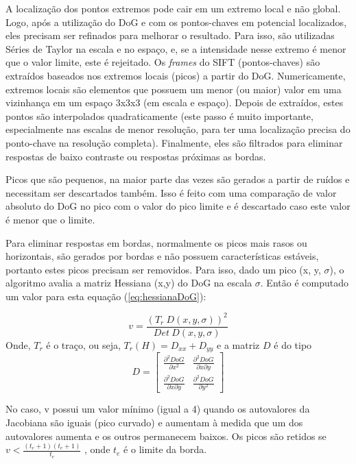 A localização dos pontos extremos pode cair em um extremo local e não global. Logo, após a utilização do DoG e com os pontos-chaves em potencial localizados, eles precisam ser refinados para melhorar o resultado. Para isso, são utilizadas Séries de Taylor na escala e no espaço, e, se a intensidade nesse extremo é menor que o valor limite, este é rejeitado.
Os {\it frames} do SIFT (pontos-chaves) são extraídos baseados nos extremos locais (picos) a partir do DoG. Numericamente, extremos locais são elementos que possuem um menor (ou maior) valor em uma vizinhança em um espaço 3x3x3 (em escala e espaço).
Depois de extraídos, estes pontos são interpolados quadraticamente (este passo é muito importante, especialmente nas escalas de menor resolução, para ter uma localização precisa do ponto-chave na resolução completa). Finalmente, eles são filtrados para eliminar respostas de baixo contraste ou respostas próximas as bordas.


Picos que são pequenos, na maior parte das vezes são gerados a partir de ruídos e necessitam ser descartados também. Isso é feito com uma comparação de valor absoluto do DoG no pico com o valor do pico limite e é descartado caso este valor é menor que o limite.



Para eliminar respostas em bordas, normalmente os picos mais rasos ou horizontais, são gerados por bordas e não possuem características estáveis, portanto estes picos precisam ser removidos. Para isso, dado um pico (x, y, $\sigma$), o algoritmo avalia a matriz Hessiana (x,y) do DoG na escala $\sigma$. Então é computado um valor para esta equação (\ref{eq:hessianaDoG}):

\begin{equation}
	v = \frac{( T_r \ D(x,y,\sigma))^2}{Det \ D(x,y,\sigma)}
	\label{eq:hessianaDoG}
\end{equation}
Onde, $T_r$ é o traço, ou seja, $T_r(H) = D_{xx} + D_{yy}$ e a matriz $D$ é do tipo
\[D = \begin{bmatrix}
	\frac{\partial ^2 DoG}{\partial x^2} & \frac{\partial ^2 DoG}{\partial x \partial y} \\ 
	\frac{\partial ^2 DoG}{\partial x \partial y} & \frac{\partial ^2 DoG}{\partial y^2} 
\end{bmatrix}
\]

No caso, v possui um valor mínimo (igual a 4) quando os autovalores da Jacobiana são iguais (pico curvado) e aumentam à medida que um dos autovalores aumenta e os outros permanecem baixos. Os picos são retidos se $v  < \frac{(t_e+1)(t_e+1)}{t_e}$ , onde $t_e$ é o limite da borda. 

